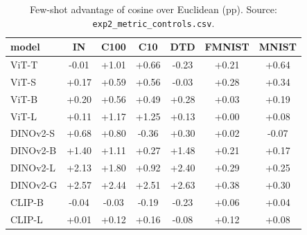\begin{table}[H]
\centering
\small
\begin{tabular}{lcccccc}
\toprule
model & IN & C100 & C10 & DTD & FMNIST & MNIST \\
\midrule
ViT-T & -0.01 & +1.01 & +0.66 & -0.23 & +0.21 & +0.64 \\
ViT-S & +0.17 & +0.59 & +0.56 & -0.03 & +0.28 & +0.34 \\
ViT-B & +0.20 & +0.56 & +0.49 & +0.28 & +0.03 & +0.19 \\
ViT-L & +0.11 & +1.17 & +1.25 & +0.13 & +0.00 & +0.08 \\
DINOv2-S & +0.68 & +0.80 & -0.36 & +0.30 & +0.02 & -0.07 \\
DINOv2-B & +1.40 & +1.11 & +0.27 & +1.48 & +0.21 & +0.17 \\
DINOv2-L & +2.13 & +1.80 & +0.92 & +2.40 & +0.29 & +0.25 \\
DINOv2-G & +2.57 & +2.44 & +2.51 & +2.63 & +0.38 & +0.30 \\
CLIP-B & -0.04 & -0.03 & -0.19 & -0.23 & +0.06 & +0.04 \\
CLIP-L & +0.01 & +0.12 & +0.16 & -0.08 & +0.12 & +0.08 \\
\bottomrule
\end{tabular}
\caption{Few-shot advantage of cosine over Euclidean (pp). Source: \texttt{exp2\_metric\_controls.csv}.}
\label{tab:a4}
\end{table}
